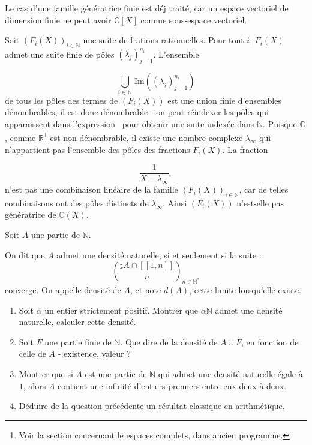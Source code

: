 \begin{sol}
Le cas d'une famille g\'en\'eratrice finie est d\'ej trait\'e, car un espace vectoriel de dimension finie ne peut avoir %
$\mathbb{C} [X]$ comme sous-espace vectoriel.

\par
Soit \((F_i(X))_{i\in\mathbb{N}}\) une suite de frations rationnelles. %
Pour tout \(i\), \(F_i(X)\) admet une suite finie de p\^oles \((\lambda_j)_{j=1}^{n_i}\). %
L'ensemble

\begin{equation}
\bigcup\limits_{i\in\mathbb{N}}\,\text{Im}((\lambda_j)_{j=1}^{n_i})
\label{eq:def_poles_ij}
\end{equation}
de tous les p\^oles des termes de \((F_i(X))\) est une union finie d'ensembles d\'enombrables, %
il est donc d\'enombrable - on peut r\'eindexer les p\^oles qui apparaissent dans l'expression~ %
pour obtenir une suite index\'ee dans \(\mathbb{N}\). %
Puisque \(\mathbb{C}\), comme \(\mathbb{R}\)\footnote{Voir la section concernant le espaces complets, dans ancien programme.}%
est non d\'enombrable, il existe une nombre complexe \(\lambda_{\infty}\) qui n'appartient pas  l'ensemble des p\^oles des fractions \(F_i(X)\). %
La fraction

\[\frac{1}{X-\lambda_{\infty}},\]
n'est pas une combinaison lin\'eaire de la famille \((F_i(X))_{i\in\mathbb{N}}\), %
car de telles combinaisons ont des p\^oles distincts de \(\lambda_{\infty}\). %
Ainsi \((F_i(X))\) n'est-elle pas g\'en\'eratrice de \(\mathbb{C}(X)\).
\end{sol}


\begin{exer}
Soit $A$ une partie de $\mathbb{N}$.

\par
On dit que $A$ admet une densit\'e naturelle, si et seulement si la suite :
\[\left(\frac{\sharp A \cap [\![1,n]\!]}{n}\right)_{n \in \mathbb{N}^{\ast}}\]
converge. %
On appelle densit\'e de $A$, et note $d(A)$, cette limite lorsqu'elle existe.
\begin{enumerate}
\item Soit $\alpha$ un entier strictement positif. Montrer que $\alpha \mathbb{N}$ admet une densit\'e naturelle, %
calculer cette densit\'e.
\item Soit \(F\) une partie finie de \(\mathbb{N}\). Que dire de la densit\'e de \(A\cup F\), en fonction de celle de \(A\) - existence, valeur ?
\item Montrer que si $A$ est une partie de $\mathbb{N}$ qui admet une densit\'e naturelle \'egale à $1$, %
alors $A$ contient une infinit\'e d'entiers premiers entre eux deux-à-deux.
\item D\'eduire de la question pr\'ec\'edente un r\'esultat classique en arithm\'etique.%
\end{enumerate}
\end{exer}

